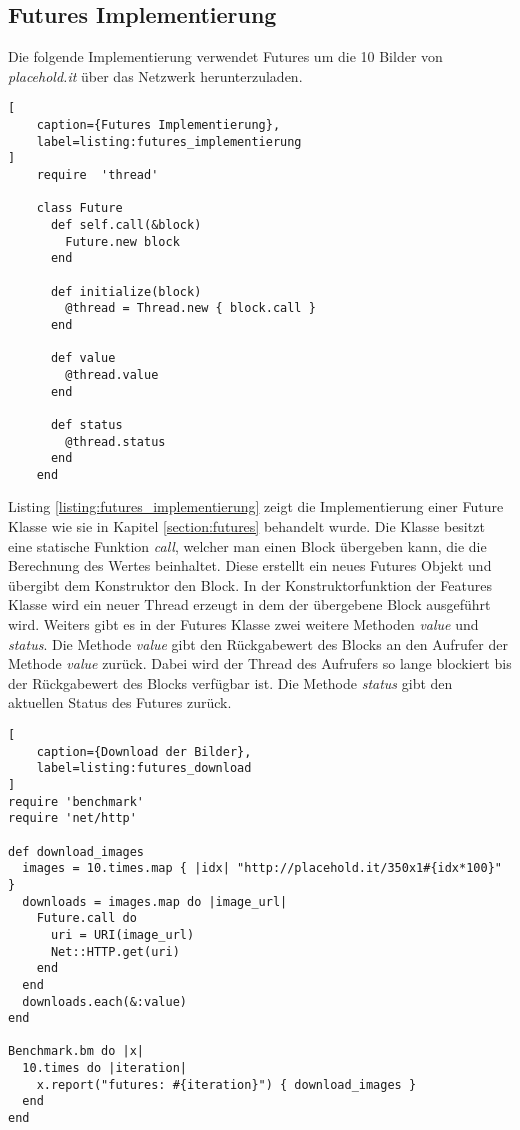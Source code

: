 \subsection{Futures Implementierung}

Die folgende Implementierung verwendet Futures um die 10 Bilder von \emph{placehold.it} über das Netzwerk herunterzuladen.

\begin{lstlisting}[
	caption={Futures Implementierung},
	label=listing:futures_implementierung
]
	require  'thread'

	class Future
	  def self.call(&block)
	    Future.new block
	  end

	  def initialize(block)
	    @thread = Thread.new { block.call }
	  end

	  def value
	    @thread.value
	  end

	  def status
	    @thread.status
	  end
	end
\end{lstlisting}

Listing \ref{listing:futures_implementierung} zeigt die Implementierung einer Future Klasse wie sie in Kapitel \ref{section:futures} behandelt wurde. Die Klasse besitzt eine statische Funktion \emph{call}, welcher man einen Block übergeben kann, die die Berechnung des Wertes beinhaltet. Diese erstellt ein neues Futures Objekt und übergibt dem Konstruktor den Block. In der Konstruktorfunktion der Features Klasse wird ein neuer Thread erzeugt in dem der übergebene Block ausgeführt wird. Weiters gibt es in der Futures Klasse zwei weitere Methoden \emph{value} und \emph{status}. Die Methode \emph{value} gibt den Rückgabewert des Blocks an den Aufrufer der Methode \emph{value} zurück. Dabei wird der Thread des Aufrufers so lange blockiert bis der Rückgabewert des Blocks verfügbar ist. Die Methode \emph{status} gibt den aktuellen Status des Futures zurück.

\begin{lstlisting}[
	caption={Download der Bilder},
	label=listing:futures_download
]
require 'benchmark'
require 'net/http'

def download_images
  images = 10.times.map { |idx| "http://placehold.it/350x1#{idx*100}" }
  downloads = images.map do |image_url|
    Future.call do
      uri = URI(image_url)
      Net::HTTP.get(uri)
    end
  end
  downloads.each(&:value)
end

Benchmark.bm do |x|
  10.times do |iteration|
    x.report("futures: #{iteration}") { download_images }
  end
end
\end{lstlisting}

